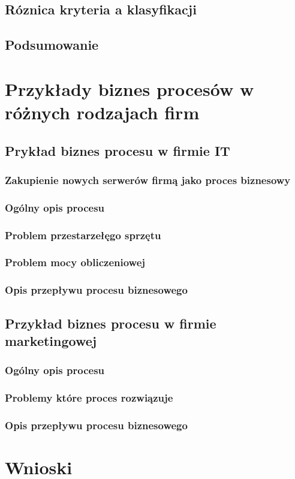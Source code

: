 \documentclass[a4paper, 12pt]{article}
\begin{document}
\subsection{Róznica kryteria a klasyfikacji}
\subsection{Podsumowanie}

\section{Przykłady biznes procesów w różnych rodzajach firm}
\subsection{Prykład biznes procesu w firmie IT}
\subsubsection{Zakupienie nowych serwerów firmą jako proces biznesowy}
\subsubsection{Ogólny opis procesu}
\subsubsection{Problem przestarzełęgo sprzętu} 
\subsubsection{Problem mocy obliczeniowej} 
\subsubsection{Opis przepływu procesu biznesowego}

\subsection{Przykład biznes procesu w firmie marketingowej}
\subsubsection{Ogólny opis procesu}
\subsubsection{Problemy które proces rozwiązuje}
\subsubsection{Opis przepływu procesu biznesowego}

\section{Wnioski} 


\label{LastPage}~
\label{LastPageOfBackMatter}~		
\end{document}
